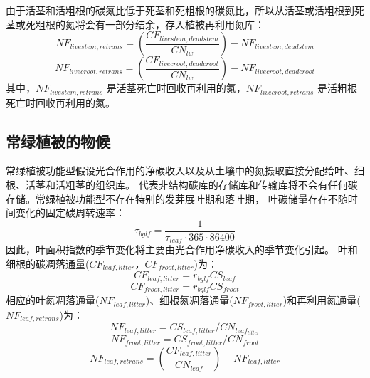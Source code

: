 \begin{enumerate}
由于活茎和活粗根的碳氮比低于死茎和死粗根的碳氮比，所以从活茎或活粗根到死茎或死粗根的氮将会有一部分结余，存入植被再利用氮库：
\begin{equation}
NF_{{livestem,retrans}}=\left(\frac{CF_{{livestem,deadstem}}}{CN_{lw}}\right)-NF_{{livestem,deadstem}}
\end{equation}
\begin{equation}
NF_{{livecroot,retrans}}=\left(\frac{CF_{{livecroot,deadcroot}}}{CN_{lw}}\right)-NF_{{livecroot,deadcroot}}
\end{equation}
其中，$NF_{livestem,retrans}$ 是活茎死亡时回收再利用的氮，$NF_{livecroot,retrans}$ 是活粗根死亡时回收再利用的氮。

\end{enumerate}


\subsection{常绿植被的物候}\label{常绿植被的物候}
常绿植被功能型假设光合作用的净碳收入以及从土壤中的氮摄取直接分配给叶、细根、活茎和活粗茎的组织库。
代表非结构碳库的存储库和传输库将不会有任何碳存储。常绿植被功能型不存在特别的发芽展叶期和落叶期，
叶碳储量存在不随时间变化的固定碳周转速率：
\begin{equation}
\tau_{bglf}=\frac{1}{\tau_{leaf} \cdot 365 \cdot 86400}
\end{equation}
因此，叶面积指数的季节变化将主要由光合作用净碳收入的季节变化引起。
叶和细根的碳凋落通量($CF_{leaf,litter}$，$CF_{froot,litter}$)为：
\begin{equation}
CF_{leaf,litter}=r_{bglf} CS_{leaf}
\end{equation}
\begin{equation}
CF_{froot,litter}=r_{bglf} CS_{froot}
\end{equation}
相应的叶氮凋落通量($NF_{leaf,litter}$)、细根氮凋落通量($NF_{froot,litter}$)和再利用氮通量($NF_{leaf,retrans}$)为：
\begin{equation}
N F_{leaf,litter}=CS_{leaf,litter} / CN_{leaf_{litter}}
\end{equation}
\begin{equation}
N F_{froot,litter}=CS_{froot,litter} / CN_{froot}
\end{equation}
\begin{equation}
N F_{leaf,retrans}=\left(\frac{CF_{leaf,litter }}{CN_{leaf}}\right)-N F_{leaf,litter}
\end{equation}


